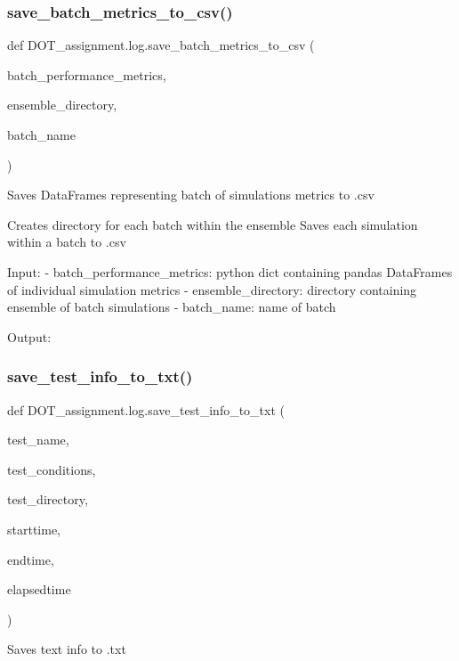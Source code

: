 \subsubsection{\texorpdfstring{save\_batch\_metrics\_to\_csv()}{save\_batch\_metrics\_to\_csv()}}
{\footnotesize\ttfamily def D\+O\+T\+\_\+assignment.\+log.\+save\+\_\+batch\+\_\+metrics\+\_\+to\+\_\+csv (\begin{DoxyParamCaption}\item[{}]{batch\+\_\+performance\+\_\+metrics,  }\item[{}]{ensemble\+\_\+directory,  }\item[{}]{batch\+\_\+name }\end{DoxyParamCaption})}

\begin{DoxyVerb}Saves DataFrames representing batch of simulations metrics to .csv

Creates directory for each batch within the ensemble
Saves each simulation within a batch to .csv

Input:
- batch_performance_metrics:    python dict containing pandas DataFrames of individual simulation metrics
- ensemble_directory:           directory containing ensemble of batch simulations
- batch_name:                   name of batch

Output:\end{DoxyVerb}
 \mbox{\label{namespace_d_o_t__assignment_1_1log_ab59d5c33559471fa2b12e4cec9729c33}} 
\subsubsection{\texorpdfstring{save\_test\_info\_to\_txt()}{save\_test\_info\_to\_txt()}}
{\footnotesize\ttfamily def D\+O\+T\+\_\+assignment.\+log.\+save\+\_\+test\+\_\+info\+\_\+to\+\_\+txt (\begin{DoxyParamCaption}\item[{}]{test\+\_\+name,  }\item[{}]{test\+\_\+conditions,  }\item[{}]{test\+\_\+directory,  }\item[{}]{starttime,  }\item[{}]{endtime,  }\item[{}]{elapsedtime }\end{DoxyParamCaption})}

\begin{DoxyVerb}Saves text info to .txt
\end{DoxyVerb}
 